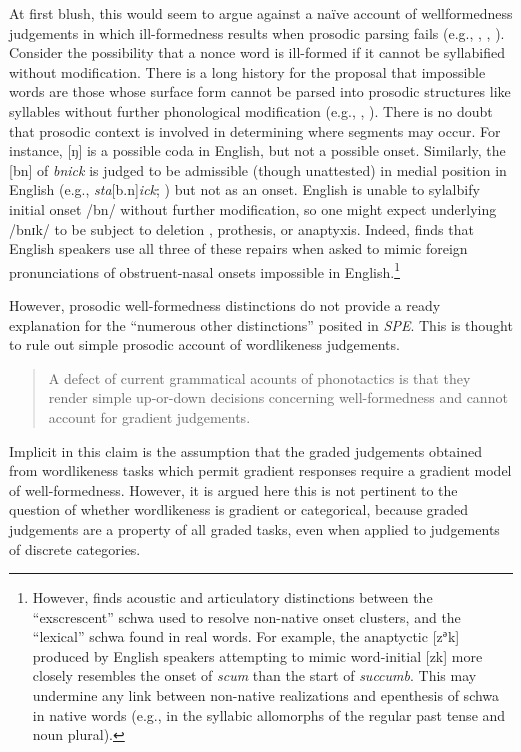 At first blush, this would seem to argue against a naïve account of wellformedness judgements in which ill-formedness results when prosodic parsing fails (e.g., \citealt{Ito1989a}, \citealt{Noske1992}, \citealt{OT}). Consider the possibility that a nonce word is ill-formed if it cannot be syllabified without modification. There is a long history for the proposal that impossible words are those whose surface form cannot be parsed into prosodic structures like syllables without further phonological modification (e.g., \citealt[10f.]{Hooper1973}, \citealt[57f.]{Kahn1976}). There is no doubt that prosodic context is involved in determining where segments may occur. For instance, [ŋ] is a possible coda in English, but not a possible onset. Similarly, the [bn] of \emph{bnick} is judged to be admissible (though unattested) in medial position in English (e.g., \emph{sta}[b.n]\emph{ick}; \citealt[97]{Hooper1973}) but not as an onset. English is unable to sylalbify initial onset /bn/ without further modification, so one might expect underlying /bnɪk/ to be subject to deletion \citep[19f.]{Wolf2009}, prothesis, or anaptyxis. Indeed, \citet{Davidson2006b} finds that English speakers use all three of these repairs when asked to mimic foreign pronunciations of obstruent-nasal onsets impossible in English.\footnote{However, \citet{Davidson2005,Davidson2006a} finds acoustic and articulatory distinctions between the ``exscrescent'' schwa used to resolve non-native onset clusters, and the ``lexical'' schwa found in real words. For example, the anaptyctic [z${^\textrm{ə}}$k] produced by English speakers attempting to mimic word-initial [zk] more closely resembles the onset of \emph{scum} than the start of \emph{succumb}. This may undermine any link between non-native realizations and epenthesis of schwa in native words (e.g., in the syllabic allomorphs of the regular past tense and noun plural).}

However, prosodic well-formedness distinctions do not provide a ready explanation for the ``numerous other distinctions'' posited in \emph{SPE}. This is thought to rule out simple prosodic account of wordlikeness judgements.

\begin{quote}
A defect of current grammatical acounts of phonotactics is that they render simple up-or-down decisions concerning well-formedness and cannot account for gradient judgements. \citep[371]{Shademan2006}
\end{quote}

Implicit in this claim is the assumption that the graded judgements obtained from wordlikeness tasks which permit gradient responses require a gradient model of well-formedness. However, it is argued here this is not pertinent to the question of whether wordlikeness is gradient or categorical, because graded judgements are a property of all graded tasks, even when applied to judgements of discrete categories.

